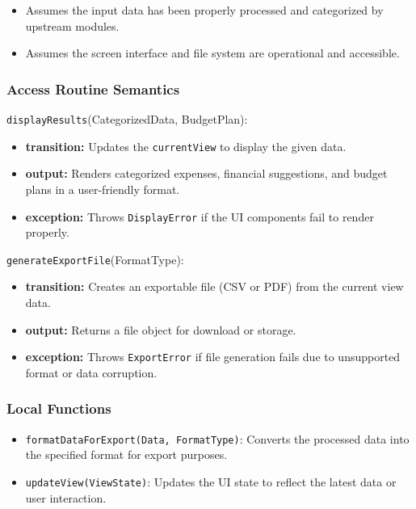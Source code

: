 \documentclass[12pt, titlepage]{article}
\begin{document}
\begin{itemize}
    \item Assumes the input data has been properly processed and categorized by upstream modules.
    \item Assumes the screen interface and file system are operational and accessible.
\end{itemize}

\subsubsection{Access Routine Semantics}

\noindent \texttt{displayResults}(CategorizedData, BudgetPlan):
\begin{itemize}
    \item \textbf{transition:} Updates the \texttt{currentView} to display the given data.
    \item \textbf{output:} Renders categorized expenses, financial suggestions, and budget plans in a user-friendly format.
    \item \textbf{exception:} Throws \texttt{DisplayError} if the UI components fail to render properly.
\end{itemize}

\noindent \texttt{generateExportFile}(FormatType):
\begin{itemize}
    \item \textbf{transition:} Creates an exportable file (CSV or PDF) from the current view data.
    \item \textbf{output:} Returns a file object for download or storage.
    \item \textbf{exception:} Throws \texttt{ExportError} if file generation fails due to unsupported format or data corruption.
\end{itemize}

\subsubsection{Local Functions}

\begin{itemize}
    \item \texttt{formatDataForExport(Data, FormatType)}: Converts the processed data into the specified format for export purposes.
    \item \texttt{updateView(ViewState)}: Updates the UI state to reflect the latest data or user interaction.
\end{itemize}
\end{document}
